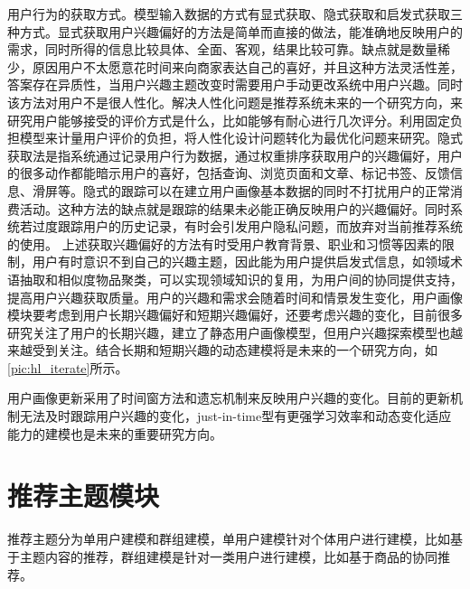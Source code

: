   用户行为的获取方式。模型输入数据的方式有显式获取、隐式获取和启发式获取三种方式。显式获取用户兴趣偏好的方法是简单而直接的做法，能准确地反映用户的需求，同时所得的信息比较具体、全面、客观，结果比较可靠。缺点就是数量稀少，原因用户不太愿意花时间来向商家表达自己的喜好，并且这种方法灵活性差，答案存在异质性，当用户兴趣主题改变时需要用户手动更改系统中用户兴趣。同时该方法对用户不是很人性化。解决人性化问题是推荐系统未来的一个研究方向，来研究用户能够接受的评价方式是什么，比如能够有耐心进行几次评分。利用固定负担模型来计量用户评价的负担，将人性化设计问题转化为最优化问题来研究。隐式获取法是指系统通过记录用户行为数据，通过权重排序获取用户的兴趣偏好，用户的很多动作都能暗示用户的喜好，包括查询、浏览页面和文章、标记书签、反馈信息、滑屏等。隐式的跟踪可以在建立用户画像基本数据的同时不打扰用户的正常消费活动。这种方法的缺点就是跟踪的结果未必能正确反映用户的兴趣偏好。同时系统若过度跟踪用户的历史记录，有时会引发用户隐私问题，而放弃对当前推荐系统的使用。 上述获取兴趣偏好的方法有时受用户教育背景、职业和习惯等因素的限制，用户有时意识不到自己的兴趣主题，因此能为用户提供启发式信息，如领域术语抽取和相似度物品聚类，可以实现领域知识的复用，为用户间的协同提供支持，提高用户兴趣获取质量。用户的兴趣和需求会随着时间和情景发生变化，用户画像模块要考虑到用户长期兴趣偏好和短期兴趣偏好，还要考虑兴趣的变化，目前很多研究关注了用户的长期兴趣，建立了静态用户画像模型，但用户兴趣探索模型也越来越受到关注。结合长期和短期兴趣的动态建模将是未来的一个研究方向，如\autoref{pic:hl_iterate}所示。
  \begin{figure}
    \centering
      \label{pic:hl_iterate}
  \end{figure}

  用户画像更新采用了时间窗方法和遗忘机制来反映用户兴趣的变化。目前的更新机制无法及时跟踪用户兴趣的变化，just-in-time型有更强学习效率和动态变化适应能力的建模也是未来的重要研究方向。 

  \section{推荐主题模块}
  推荐主题分为单用户建模和群组建模，单用户建模针对个体用户进行建模，比如基于主题内容的推荐，群组建模是针对一类用户进行建模，比如基于商品的协同推荐。

